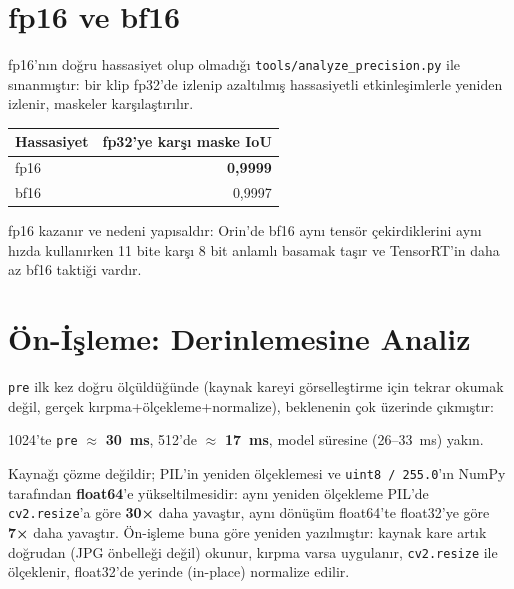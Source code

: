 \section{fp16 ve bf16}
\label{sec:hassasiyet}

fp16'nın doğru hassasiyet olup olmadığı \texttt{tools/analyze\_precision.py}
ile sınanmıştır: bir klip fp32'de izlenip azaltılmış hassasiyetli
etkinleşimlerle yeniden izlenir, maskeler karşılaştırılır.

\begin{olcum}
\begin{center}
\begin{tabular}{lr}
  \toprule
  Hassasiyet & fp32'ye karşı maske IoU \\
  \midrule
  fp16 & \textbf{0,9999} \\
  bf16 & 0,9997 \\
  \bottomrule
\end{tabular}
\end{center}
\end{olcum}

fp16 kazanır ve nedeni yapısaldır: Orin'de bf16 aynı tensör
çekirdiklerini aynı hızda kullanırken 11 bite karşı 8 bit anlamlı
basamak taşır ve TensorRT'in daha az bf16 taktiği vardır.

\section{Ön-İşleme: Derinlemesine Analiz}
\label{sec:onisleme-analizi}

\texttt{pre} ilk kez doğru ölçüldüğünde (kaynak kareyi görselleştirme
için tekrar okumak değil, gerçek kırpma+ölçekleme+normalize), beklenenin
çok üzerinde çıkmıştır:

\begin{olcum}
1024'te \texttt{pre} $\approx$ \textbf{30~ms}, 512'de $\approx$
\textbf{17~ms}, model süresine (26--33~ms) yakın.
\end{olcum}

Kaynağı çözme değildir; PIL'in yeniden ölçeklemesi ve
\texttt{uint8 / 255.0}'ın NumPy tarafından \textbf{float64}'e
yükseltilmesidir: aynı yeniden ölçekleme PIL'de \texttt{cv2.resize}'a
göre \textbf{30×} daha yavaştır, aynı dönüşüm float64'te float32'ye
göre \textbf{7×} daha yavaştır. Ön-işleme buna göre yeniden yazılmıştır:
kaynak kare artık doğrudan (JPG önbelleği değil) okunur, kırpma varsa
uygulanır, \texttt{cv2.resize} ile ölçeklenir, float32'de yerinde
(in-place) normalize edilir.

